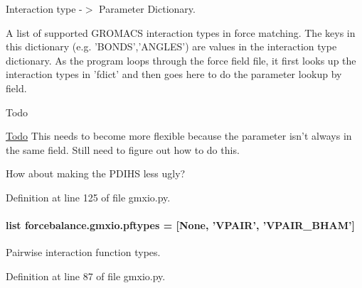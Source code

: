 Interaction type -\/$>$ Parameter Dictionary. 

A list of supported G\-R\-O\-M\-A\-C\-S interaction types in force matching. The keys in this dictionary (e.\-g. 'B\-O\-N\-D\-S','A\-N\-G\-L\-E\-S') are values in the interaction type dictionary. As the program loops through the force field file, it first looks up the interaction types in 'fdict' and then goes here to do the parameter lookup by field. \begin{DoxyRefDesc}{Todo}
\item[\hyperlink{todo__todo000010}{Todo}]This needs to become more flexible because the parameter isn't always in the same field. Still need to figure out how to do this. 

How about making the P\-D\-I\-H\-S less ugly? \end{DoxyRefDesc}


Definition at line 125 of file gmxio.\-py.

\hypertarget{namespaceforcebalance_1_1gmxio_a59695b79df36efbe64ac88fd64bfb366}{
\paragraph[{pftypes}]{\setlength{\rightskip}{0pt plus 5cm}list forcebalance.\-gmxio.\-pftypes = \mbox{[}None, 'V\-P\-A\-I\-R', 'V\-P\-A\-I\-R\-\_\-\-B\-H\-A\-M'\mbox{]}}}\label{namespaceforcebalance_1_1gmxio_a59695b79df36efbe64ac88fd64bfb366}


Pairwise interaction function types. 



Definition at line 87 of file gmxio.\-py.

